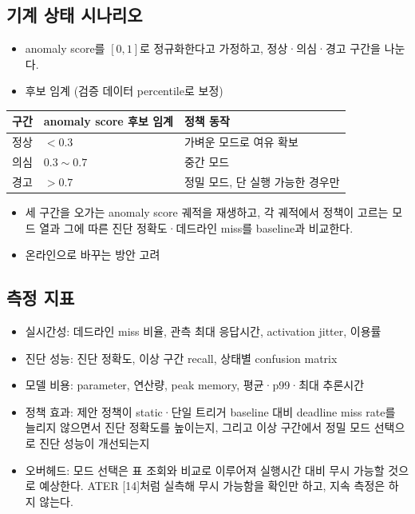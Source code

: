 \documentclass[10pt]{article}
\begin{document}
\subsection{기계 상태 시나리오}
\begin{itemize}
\item anomaly score를 $[0, 1]$로 정규화한다고 가정하고, 정상·의심·경고 구간을 나눈다.
\item 후보 임계 (검증 데이터 percentile로 보정)
\end{itemize}
\begin{center}\footnotesize
\begin{tabular}{@{}lL{4cm}L{6cm}@{}}
\toprule
구간 & anomaly score 후보 임계 & 정책 동작 \\ \midrule
정상 & $< 0.3$ & 가벼운 모드로 여유 확보 \\
의심 & $0.3 \sim 0.7$ & 중간 모드 \\
경고 & $> 0.7$ & 정밀 모드, 단 실행 가능한 경우만 \\
\bottomrule
\end{tabular}
\end{center}
\begin{itemize}
\item 세 구간을 오가는 anomaly score 궤적을 재생하고, 각 궤적에서 정책이 고르는 모드 열과 그에 따른 진단 정확도·데드라인 miss를 baseline과 비교한다.
\item 온라인으로 바꾸는 방안 고려
\end{itemize}

\subsection{측정 지표}
\begin{itemize}
\item 실시간성: 데드라인 miss 비율, 관측 최대 응답시간, activation jitter, 이용률
\item 진단 성능: 진단 정확도, 이상 구간 recall, 상태별 confusion matrix
\item 모델 비용: parameter, 연산량, peak memory, 평균·p99·최대 추론시간
\item 정책 효과: 제안 정책이 static·단일 트리거 baseline 대비 deadline miss rate를 늘리지 않으면서 진단 정확도를 높이는지, 그리고 이상 구간에서 정밀 모드 선택으로 진단 성능이 개선되는지
\item 오버헤드: 모드 선택은 표 조회와 비교로 이루어져 실행시간 대비 무시 가능할 것으로 예상한다. ATER [14]처럼 실측해 무시 가능함을 확인만 하고, 지속 측정은 하지 않는다.
\end{itemize}
\end{document}

